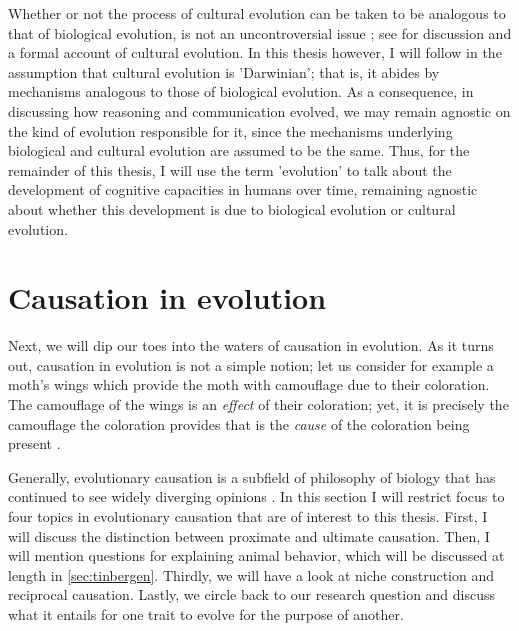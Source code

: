 Whether or not the process of cultural evolution can be taken to be analogous to that of biological evolution, is not an uncontroversial issue ; see \citet{Claidiere14} for discussion and a formal account of cultural evolution.
In this thesis however, I will follow \citet{Heyes18} in the assumption that cultural evolution is 'Darwinian'; that is, it abides by mechanisms analogous to those of biological evolution.
As a consequence, in discussing how reasoning and communication evolved, we may remain agnostic on the kind of evolution responsible for it, since the mechanisms underlying biological and cultural evolution are assumed to be the same.
Thus, for the remainder of this thesis, I will use the term 'evolution' to talk about the development of cognitive capacities in humans over time, remaining agnostic about whether this development is due to biological evolution or cultural evolution.


\section{Causation in evolution}
\label{sec:causation-evolution}

Next, we will dip our toes into the waters of causation in evolution. As it turns out, causation in evolution is not a simple notion; let us consider for example a moth's wings which provide the moth with camouflage due to their coloration. The camouflage of the wings is an \emph{effect} of their coloration; yet, it is precisely the camouflage the coloration provides that is the \emph{cause} of the coloration being present \citep{Lipton09}.

Generally, evolutionary causation is a subfield of philosophy of biology that has continued to see widely diverging opinions \citep{Baedke2021, UllerLaland19, S-P13}. In this section I will restrict focus to four topics in evolutionary causation that are of interest to this thesis. First, I will discuss the distinction between proximate and ultimate causation. Then, I will mention  questions for explaining animal behavior, which will be discussed at length in \cref{sec:tinbergen}. Thirdly, we will have a look at niche construction and reciprocal causation. Lastly, we circle back to our research question and discuss what it entails for one trait to evolve for the purpose of another.


